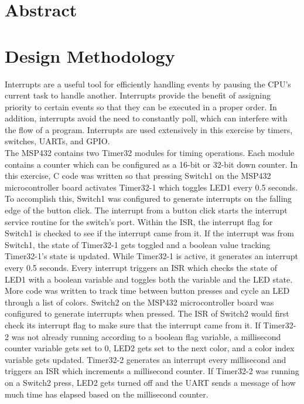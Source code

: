 \documentclass[CMPE]{KGCOEReport}
\begin{document}
\maketitle

\section*{Abstract}

\section*{Design Methodology}

Interrupts are a useful tool for efficiently handling events by pausing the CPU's current task to handle another. Interrupts provide the benefit of assigning priority to certain events so that they can be executed in a proper order. In addition, interrupts avoid the need to constantly poll, which can interfere with the flow of a program. Interrupts are used extensively in this exercise by timers, switches, UARTs, and GPIO.\\

The MSP432 contains two Timer32 modules for timing operations. Each module contains a counter which can be configured as a 16-bit or 32-bit down counter. In this exercise, C code was written so that pressing Switch1 on the MSP432 microcontroller board activates Timer32-1 which toggles LED1 every 0.5 seconds. To accomplish this, Switch1 was configured to generate interrupts on the falling edge of the button click. The interrupt from a button click starts the interrupt service routine for the switch's port. Within the ISR, the interrupt flag for Switch1 is checked to see if the interrupt came from it. If the interrupt was from Switch1, the state of Timer32-1 gets toggled and a boolean value tracking Timer32-1's state is updated. While Timer32-1 is active, it generates an interrupt every 0.5 seconds. Every interrupt triggers an ISR which checks the state of LED1 with a boolean variable and toggles both the variable and the LED state.\\

More code was written to track time between button presses and cycle an LED through a list of colors. Switch2 on the MSP432 microcontroller board was configured to generate interrupts when pressed. The ISR of Switch2 would first check its interrupt flag to make sure that the interrupt came from it. If Timer32-2 was not already running according to a boolean flag variable, a millisecond counter variable gets set to 0, LED2 gets set to the next color, and a color index variable gets updated. Timer32-2 generates an interrupt every millisecond and triggers an ISR which increments a millisecond counter. If Timer32-2 was running on a Switch2 press, LED2 gets turned off and the UART sends a message of how much time has elapsed based on the millisecond counter. \\
\end{document}
